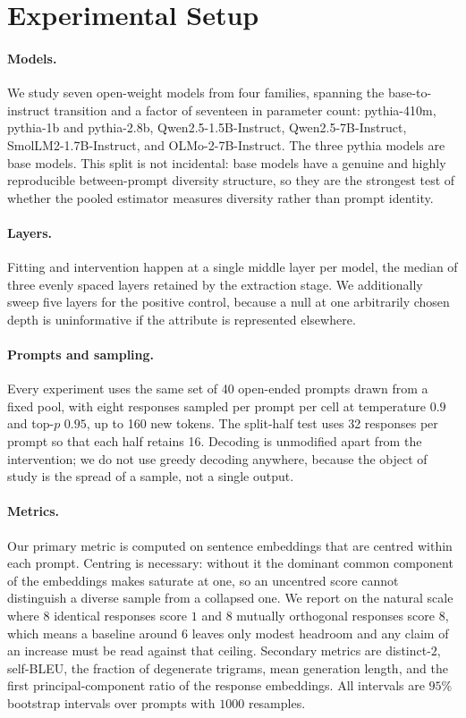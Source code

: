 \section{Experimental Setup}
\label{sec:setup}

\paragraph{Models.}
We study seven open-weight models from four families, spanning the base-to-instruct transition and a
factor of seventeen in parameter count: pythia-410m, pythia-1b and pythia-2.8b, Qwen2.5-1.5B-Instruct,
Qwen2.5-7B-Instruct, SmolLM2-1.7B-Instruct, and OLMo-2-7B-Instruct. The three pythia models are base
models. This split is not incidental: base models have a genuine and highly reproducible
between-prompt diversity structure, so they are the strongest test of whether the pooled estimator
measures diversity rather than prompt identity.

\paragraph{Layers.}
Fitting and intervention happen at a single middle layer per model, the median of three evenly
spaced layers retained by the extraction stage. We additionally sweep five layers for the positive
control, because a null at one arbitrarily chosen depth is uninformative if the attribute is
represented elsewhere.

\paragraph{Prompts and sampling.}
Every experiment uses the same set of 40 open-ended prompts drawn from a fixed pool, with eight
responses sampled per prompt per cell at temperature $0.9$ and top-$p$ $0.95$, up to 160 new tokens.
The split-half test uses 32 responses per prompt so that each half retains 16. Decoding is
unmodified apart from the intervention; we do not use greedy decoding anywhere, because the object
of study is the spread of a sample, not a single output.

\paragraph{Metrics.}
Our primary metric is \vendi{} \citep{friedman2022vendi} computed on sentence embeddings that are
centred within each prompt. Centring is necessary: without it the dominant common component of the
embeddings makes \vendi{} saturate at one, so an uncentred score cannot distinguish a diverse sample
from a collapsed one. We report \vendi{} on the natural scale where $8$ identical responses score
$1$ and $8$ mutually orthogonal responses score $8$, which means a baseline around $6$ leaves only
modest headroom and any claim of an increase must be read against that ceiling. Secondary metrics
are distinct-$2$, self-BLEU, the fraction of degenerate trigrams, mean generation length, and the
first principal-component ratio of the response embeddings. All intervals are $95\%$ bootstrap
intervals over prompts with $1000$ resamples.

